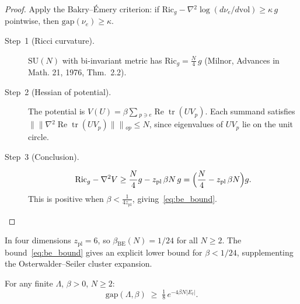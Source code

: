 \begin{proof}
Apply the Bakry--\'Emery criterion: if
$\mathrm{Ric}_g - \nabla{}{}^2\log{}(d\nu{}_e/d\mathrm{vol}) \ge{} \kappa{}\,{}g$ pointwise,
then $\mathrm{gap}(\nu{}_e)\ge{}\kappa{}$.
\begin{description}
\item[Step~1 (Ricci curvature).] $\mathrm{SU}(N)$ with bi-invariant metric has $\mathrm{Ric}_g = \frac{N}{4}\,{}g$
(Milnor, Advances in Math. 21, 1976, Thm.~2.2).

\item[Step~2 (Hessian of potential).] The potential is $V(U)=\beta{}\sum{}_{p\ni{} e}\operatorname{Re}\operatorname{tr}(UV_p)$.
Each summand satisfies $\|{}\|{}\nabla{}{}^2\operatorname{Re}\operatorname{tr}(UV_p)\|{}\|{}_{op}\le{} N$,
since eigenvalues of $UV_p$ lie on the unit circle.

\item[Step~3 (Conclusion).]
\begin{equation*}
  \mathrm{Ric}_g - \nabla{}{}^2 V
  \ge{} \frac{N}{4}g - z_{\mathrm{pl}}\,{}\beta{} N\,{}g
  = \Bigl(\frac{N}{4} - z_{\mathrm{pl}}\,{}\beta{} N\Bigr)g.
\end{equation*}
This is positive when $\beta{}<\frac{1}{4z_{\mathrm{pl}}}$, giving~\eqref{eq:be_bound}.

\end{description}
\end{proof}

\begin{remark}
In four dimensions $z_{\mathrm{pl}}=6$, so $\beta{}_{\mathrm{BE}}(N)=1/24$ for all $N\ge{}2$.
The bound~\eqref{eq:be_bound} gives an explicit lower bound for $\beta{}<1/24$,
supplementing the Osterwalder--Seiler cluster expansion.
\end{remark}

\begin{theorem}
\label{thm:cheeger_corr}
For any finite $\Lambda{}$, $\beta{}>0$, $N\ge{}2$:
\begin{equation}
\label{eq:cheeger_corr}
  \mathrm{gap}(\Lambda{},\beta{}) \;{}\ge{}\;{} \tfrac{1}{8}\,{}e^{-4\beta{} N|E_t|}.
\end{equation}
\end{theorem}

